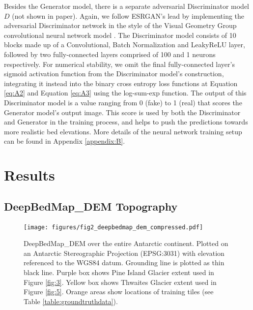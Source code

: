 \documentclass[tc, manuscript]{copernicus}
\begin{document}
Besides the Generator model, there is a separate adversarial Discriminator model $D$ (not shown in paper).
Again, we follow ESRGAN's \citep{WangESRGANEnhancedSuperResolution2018} lead by implementing the adversarial Discriminator network in the style of the Visual Geometry Group convolutional neural network model \citep[VGG,][]{SimonyanVeryDeepConvolutional2014}.
The Discriminator model consists of 10 blocks made up of a Convolutional, Batch Normalization \citep{IoffeBatchNormalizationAccelerating2015} and LeakyReLU \citep{MaasRectifiernonlinearitiesimprove2013} layer, followed by two fully-connected layers comprised of 100 and 1 neurons respectively.
For numerical stability, we omit the final fully-connected layer's sigmoid activation function from the Discriminator model's construction, integrating it instead into the binary cross entropy loss functions at Equation \eqref{eq:A2} and Equation \eqref{eq:A3} using the log-sum-exp function.
The output of this Discriminator model is a value ranging from 0 (fake) to 1 (real) that scores the Generator model's output image.
This score is used by both the Discriminator and Generator in the training process, and helps to push the predictions towards more realistic bed elevations.
More details of the neural network training setup can be found in Appendix \ref{appendix:B}.


\section{Results}

\subsection{DeepBedMap\_DEM Topography} \label{section:deepbedmapdemtopography}

\begin{figure}[htbp]
    \centering
    \texttt{[image: figures/fig2\_deepbedmap\_dem\_compressed.pdf]}
    \caption{
      DeepBedMap\_DEM over the entire Antarctic continent.
      Plotted on an Antarctic Stereographic Projection (EPSG:3031) with elevation referenced to the WGS84 datum.
      Grounding line is plotted as thin black line.
      Purple box shows Pine Island Glacier extent used in Figure \ref{fig:3}.
      Yellow box shows Thwaites Glacier extent used in Figure \ref{fig:5}.
      Orange areas show locations of training tiles (see Table \ref{table:groundtruthdata}).
    }
    \label{fig:2}
\end{figure}
\end{document}
